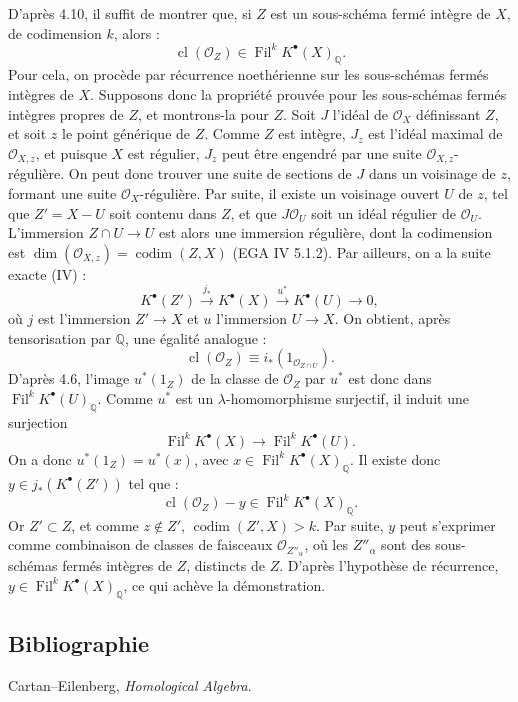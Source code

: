\documentclass[11pt]{article}
\newcommand{\Fil}{\operatorname{Fil}}
\providecommand{\codim}{\operatorname{codim}}
\providecommand{\codim}{\operatorname{codim}}
\begin{document}
D'après 4.10, il suffit de montrer que, si \(Z\) est un sous-schéma fermé intègre de \(X\), de codimension \(k\), alors :
\[
  \operatorname{cl}(\mathcal O_Z)\in\Fil^kK^\bullet(X)_{\mathbb Q}.
\]
Pour cela, on procède par récurrence noethérienne sur les sous-schémas fermés intègres de \(X\). Supposons donc la propriété prouvée pour les sous-schémas fermés intègres propres de \(Z\), et montrons-la pour \(Z\). Soit \(J\) l'idéal de \(\mathcal O_X\) définissant \(Z\), et soit \(z\) le point générique de \(Z\). Comme \(Z\) est intègre, \(J_z\) est l'idéal maximal de \(\mathcal O_{X,z}\), et puisque \(X\) est régulier, \(J_z\) peut être engendré par une suite \(\mathcal O_{X,z}\)-régulière. On peut donc trouver une suite de sections de \(J\) dans un voisinage de \(z\), formant une suite \(\mathcal O_X\)-régulière. Par suite, il existe un voisinage ouvert \(U\) de \(z\), tel que \(Z'=X-U\) soit contenu dans \(Z\), et que \(J\mathcal O_U\) soit un idéal régulier de \(\mathcal O_U\). L'immersion \(Z\cap U\to U\) est alors une immersion régulière, dont la codimension est \(\dim(\mathcal O_{X,z})=\codim(Z,X)\) (EGA IV 5.1.2). Par ailleurs, on a la suite exacte (IV) :
\[
  K^\bullet(Z')\xrightarrow{j_*}K^\bullet(X)
  \xrightarrow{u^*}K^\bullet(U)\to0,
\]
où \(j\) est l'immersion \(Z'\to X\) et \(u\) l'immersion \(U\to X\). On obtient, après tensorisation par \(\mathbb Q\), une égalité analogue :
\[
  \operatorname{cl}(\mathcal O_Z)
  \equiv i_*(1_{\mathcal O_{Z\cap U}}).
\]
D'après 4.6, l'image \(u^*(1_Z)\) de la classe de \(\mathcal O_Z\) par \(u^*\) est donc dans \(\Fil^kK^\bullet(U)_{\mathbb Q}\). Comme \(u^*\) est un \(\lambda\)-homomorphisme surjectif, il induit une surjection
\[
  \Fil^kK^\bullet(X)\longrightarrow \Fil^kK^\bullet(U).
\]
On a donc \(u^*(1_Z)=u^*(x)\), avec \(x\in\Fil^kK^\bullet(X)_{\mathbb Q}\). Il existe donc \(y\in j_*(K^\bullet(Z'))\) tel que :
\[
  \operatorname{cl}(\mathcal O_Z)-y\in\Fil^kK^\bullet(X)_{\mathbb Q}.
\]
Or \(Z'\subset Z\), et comme \(z\notin Z'\), \(\codim(Z',X)>k\). Par suite, \(y\) peut s'exprimer comme combinaison de classes de faisceaux \(\mathcal O_{Z''_\alpha}\), où les \(Z''_\alpha\) sont des sous-schémas fermés intègres de \(Z\), distincts de \(Z\). D'après l'hypothèse de récurrence, \(y\in\Fil^kK^\bullet(X)_{\mathbb Q}\), ce qui achève la démonstration.

\subsection*{Bibliographie}
\begin{enumerate}[label={[\arabic*]}]
\item Cartan--Eilenberg, \emph{Homological Algebra}.
\end{enumerate}
\end{document}
